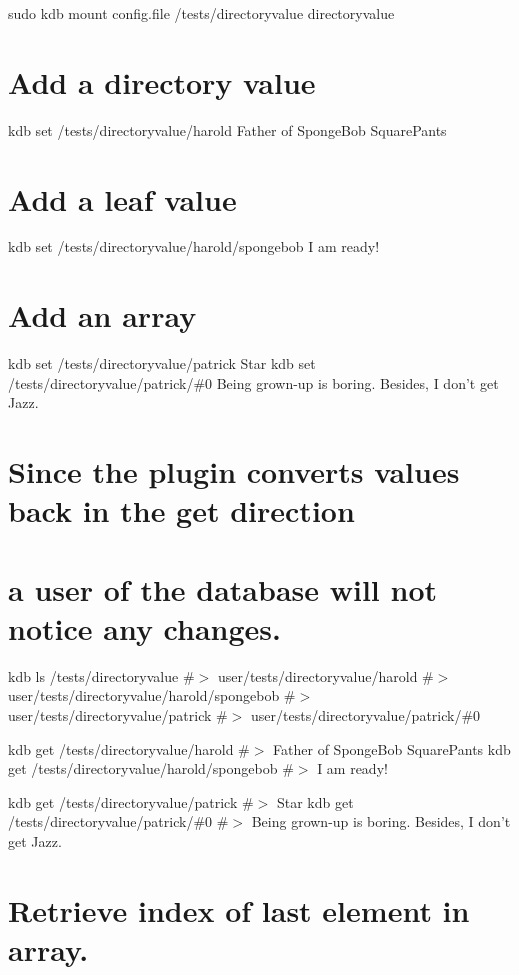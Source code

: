 sudo kdb mount config.\+file /tests/directoryvalue directoryvalue

\section*{Add a directory value}

kdb set /tests/directoryvalue/harold \textquotesingle{}Father of Sponge\+Bob Square\+Pants\textquotesingle{} \section*{Add a leaf value}

kdb set /tests/directoryvalue/harold/spongebob \textquotesingle{}I am ready!\textquotesingle{}

\section*{Add an array}

kdb set /tests/directoryvalue/patrick Star kdb set /tests/directoryvalue/patrick/\#0 \textquotesingle{}Being grown-\/up is boring. Besides, I don’t get Jazz.\textquotesingle{}

\section*{Since the plugin converts values back in the get direction}

\section*{a user of the database will not notice any changes.}

kdb ls /tests/directoryvalue \#$>$ user/tests/directoryvalue/harold \#$>$ user/tests/directoryvalue/harold/spongebob \#$>$ user/tests/directoryvalue/patrick \#$>$ user/tests/directoryvalue/patrick/\#0

kdb get /tests/directoryvalue/harold \#$>$ Father of Sponge\+Bob Square\+Pants kdb get /tests/directoryvalue/harold/spongebob \#$>$ I am ready!

kdb get /tests/directoryvalue/patrick \#$>$ Star kdb get /tests/directoryvalue/patrick/\#0 \#$>$ Being grown-\/up is boring. Besides, I don’t get Jazz.

\section*{Retrieve index of last element in array.}

